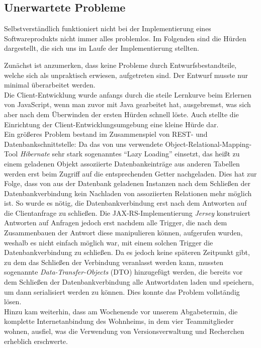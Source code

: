  
 \subsection{Unerwartete Probleme}
 \label{subsec:problems}
 Selbstverständlich funktioniert nicht bei der Implementierung eines Softwareprodukts nicht immer alles problemlos. Im Folgenden sind die Hürden dargestellt, die sich uns im Laufe der Implementierung stellten.
 
 Zunächst ist anzumerken, dass keine Probleme durch Entwurfsbestandteile, welche sich als unpraktisch erwiesen, aufgetreten sind. Der Entwurf musste nur minimal überarbeitet werden.\\
 Die Client-Entwicklung wurde anfangs durch die steile Lernkurve beim Erlernen von JavaScript, wenn man zuvor mit Java gearbeitet hat, ausgebremst, was sich aber nach dem Überwinden der ersten Hürden schnell löste. Auch stellte die Einrichtung der Client-Entwicklungsumgebung eine kleine Hürde dar.\\
 Ein größeres Problem bestand im Zusammenspiel von REST- und Datenbankschnittstelle: Da das von uns verwendete Object-Relational-Mapping-Tool \textit{Hibernate} sehr stark sogenanntes \enquote{Lazy Loading} einsetzt, das heißt zu einem geladenen Objekt assoziierte Datenbankeinträge aus anderen Tabellen werden erst beim Zugriff auf die entsprechenden Getter nachgeladen. Dies hat zur Folge, dass von aus der Datenbank geladenen Instanzen nach dem Schließen der Datenbankverbindung kein Nachladen von assoziierten Relationen mehr möglich ist. So wurde es nötig, die Datenbankverbindung erst nach dem Antworten auf die Clientanfrage zu schließen. Die JAX-RS-Implementierung \textit{Jersey} konstruiert Antworten auf Anfragen jedoch erst nachdem alle Trigger, die nach dem Zusammenbauen der Antwort diese manipulieren können, aufgerufen wurden, weshalb es nicht einfach möglich war, mit einem solchen Trigger die Datenbankverbindung zu schließen. Da es jedoch keine späteren Zeitpunkt gibt, zu dem das Schließen der Verbindung veranlasst werden kann, mussten sogenannte \textit{Data-Transfer-Objects} (DTO) hinzugefügt werden, die bereits vor dem Schließen der Datenbankverbindung alle Antwortdaten laden und speichern, um dann serialisiert werden zu können.
 Dies konnte das Problem vollständig lösen. \\
 Hinzu kam weiterhin, dass am Wochenende vor unserem Abgabetermin, die komplette Internetanbindung des Wohnheims, in dem vier Teammitglieder wohnen, ausfiel, was die Verwendung von Versionsverwaltung und Recherchen erheblich erschwerte. \\
 